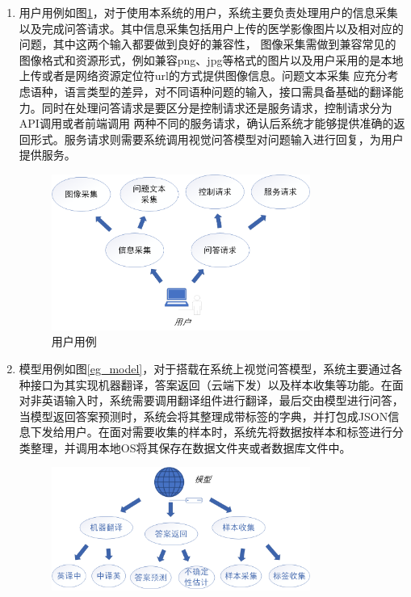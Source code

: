 \begin{enumerate}[topsep = 0 pt, itemsep= 0 pt, parsep=0pt, partopsep=0pt, leftmargin=0pt, itemindent=44pt, labelsep=6pt,  listparindent=22pt, label=(\arabic*)]
    \item 用户用例如图\ref{eg_user}，对于使用本系统的用户，系统主要负责处理用户的信息采集以及完成问答请求。其中信息采集包括用户上传的医学影像图片以及相对应的问题，其中这两个输入都要做到良好的兼容性，
    图像采集需做到兼容常见的图像格式和资源形式，例如兼容png、jpg等格式的图片以及用户采用的是本地上传或者是网络资源定位符url的方式提供图像信息。问题文本采集
	应充分考虑语种，语言类型的差异，对不同语种问题的输入，接口需具备基础的翻译能力。同时在处理问答请求是要区分是控制请求还是服务请求，控制请求分为API调用或者前端调用
	两种不同的服务请求，确认后系统才能够提供准确的返回形式。服务请求则需要系统调用视觉问答模型对问题输入进行回复，为用户提供服务。
    \begin{figure}[htbp]
        \centering	
        \includegraphics[width=0.8\textwidth]{Fig/myfig/chapter5/eg_user.png}  %
        \caption{\label{eg_user}用户用例} 
    \end{figure}
    \item 模型用例如图\ref{eg_model}，对于搭载在系统上视觉问答模型，系统主要通过各种接口为其实现机器翻译，答案返回（云端下发）以及样本收集等功能。在面对非英语输入时，系统需要调用翻译组件进行翻译，最后交由模型进行问答，
    当模型返回答案预测时，系统会将其整理成带标签的字典，并打包成JSON信息下发给用户。在面对需要收集的样本时，系统先将数据按样本和标签进行分类整理，并调用本地OS将其保存在数据文件夹或者数据库文件中。
    \begin{figure}[htbp]
        \centering	
        \includegraphics[width=0.8\textwidth]{Fig/myfig/chapter5/eg_model.png}  %

\end{figure}
\end{enumerate}
